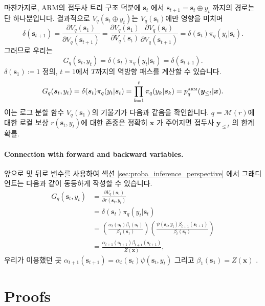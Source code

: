 \documentclass{article}
\def\s{{\bm{s}}}
\def\x{{\bm{x}}}
\def\y{{\bm{y}}}
\def\cM{{\mathcal{M}}}
\def\arm{{\textsc{arm}}}
\begin{document}
마찬가지로, 
ARM의 접두사 트리 구조 덕분에
$\s_t$ 에서 $\s_{t+1} = \s_t \oplus y_t$ 까지의 경로는 단 하나뿐입니다.
결과적으로 $V_q(\s_t \oplus y_t)$는 $V_q(\s_t)$에만 영향을 미치며
 \begin{equation} 
 \delta ( \s _{t+1}) 
= \frac{\partial V_q(\s_1)} { \partial V_q( \s _{t+1})}
= \frac{\partial V_q(\s_1)} { \partial V_q( \s _t)} \frac{\partial V_q(\s_t)} { \partial V_q( \s _{t+1})}
= \delta ( \s _t) \pi _q(y_t| \s _t).
 \end{equation} 
그러므로 우리는
 \begin{equation} 
G_q( \s _t, y_t) = \delta ( \s _t) \pi _q(y_t| \s _t) = \delta ( \s _{t+1}).
 \end{equation} 
$\delta(\s_1) \coloneqq 1$ 정의, 
$t=1$에서 $T$까지의 역방향 패스를 계산할 수 있습니다.
 \begin{equation} 
G_q( \s _t, y_t)
= \delta ( \s _t) \pi _q(y_t| \s _t) 
= \prod _{k=1}^t \pi _q(y_k| \s _k) = p^ \arm _q( \y _{ \le t} | \x ).
 \end{equation} 
이는 로그 분할 함수 $V_q(\s_1)$의 기울기가 다음과 같음을 확인합니다.
$q = \cM(r)$에 대한 로컬 보상 $r(\s_t, y_t)$에 대한 존중은 정확히
$\x$ 가 주어지면 접두사 $\y_{\le t}$ 의 한계 확률.

\paragraph{Connection with forward and backward variables.}

앞으로 및 뒤로 변수를 사용하여
섹션 \ref{sec:proba_inference_perspective} 에서 그래디언트는 다음과 같이 동등하게 작성할 수 있습니다.
 \begin{align} 
G_q( \s _t, y_t)
&= \frac{\partial V_q(\s_1)} { \partial r( \s _t, y_t)} \\
&= \delta ( \s _t) \pi _q(y_t | \s _t) \\
&= \left ( \frac{\alpha_t(\s_t) \beta_t(\s_t)} { \beta _1( \s _1)} \right ) 
 \left ( \frac { \psi ( \s _t, y_t) \beta _{t+1}( \s _{t+1})}{ \beta _t( \s _t)} \right ) \\
&= \frac { \alpha _{t+1}( \s _{t+1}) \beta _{t+1}( \s _{t+1})}{Z( \x )},
 \end{align} 
우리가 이용했던 곳 
 $\alpha_{t+1}(\s_{t+1}) = \alpha_t(\s_t)\psi(\s_t, y_t)$  
그리고 
 $\beta_1(\s_1) = Z(\x)$ .

\section{Proofs}
\end{document}
